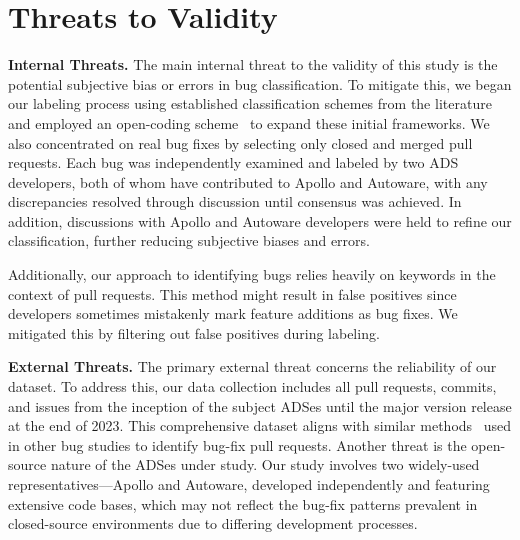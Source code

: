 \section{Threats to Validity}\label{sec:threats}

\noindent \textbf{Internal Threats.} 
The main internal threat to the validity of this study is the potential subjective bias or errors in bug classification. To mitigate this, we began our labeling process using established classification schemes from the literature~\cite{ThungWLJ12, SeamanSREFGG08} and employed an open-coding scheme~\cite{blair2015reflexive} to expand these initial frameworks. We also concentrated on real bug fixes by selecting only closed and merged pull requests. Each bug was independently examined and labeled by two ADS developers, both of whom have contributed to Apollo and Autoware, with any discrepancies resolved through discussion until consensus was achieved. In addition, discussions with Apollo and Autoware developers were held to refine our classification, further reducing subjective biases and errors.

Additionally, our approach to identifying bugs 
relies heavily on keywords 
in the context of pull requests. This method might result in false positives since developers sometimes mistakenly mark feature additions as bug fixes.
We mitigated this by filtering out false positives during labeling.

\noindent \textbf{External Threats.} 
The primary external threat concerns the reliability of our dataset. To address this, our data collection includes all pull requests, commits, and issues from the inception of the subject ADSes until the major version release at the end of 2023. 
This comprehensive dataset aligns with similar methods~\cite{GarciaF0AXC20,IslamNPR19,VasilescuYWDF15,ZhangCCXZ18,FrancoGR17} used in other bug studies to identify bug-fix pull requests. 
Another threat is the open-source nature of the ADSes under study. Our study involves two widely-used representatives---Apollo and Autoware, developed independently and featuring extensive code bases, which may not reflect the bug-fix patterns prevalent in closed-source environments due to differing development processes. 


